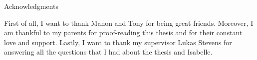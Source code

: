 \thispagestyle{empty}

\vspace*{20mm}

\begin{center}
{ Acknowledgments}
\end{center}

\vspace{10mm}

First of all, I want to thank Manon and Tony for being great friends.
Moreover, I am thankful to my parents for proof-reading this thesis and for their constant love and support.
Lastly, I want to thank my supervisor Lukas Stevens for answering all the questions that I had about the thesis and Isabelle.


\cleardoublepage{}
